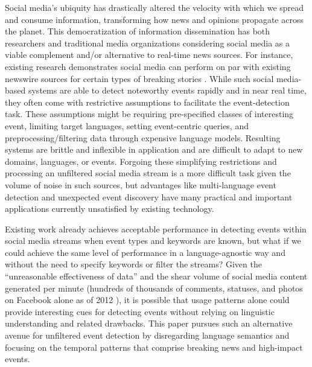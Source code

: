 \documentclass{acm_proc_article-sp}
\begin{document}
Social media's ubiquity has drastically altered the velocity with which we spread and consume information, transforming how news and opinions propagate across the planet. 
This democratization of information dissemination has both researchers and traditional media organizations considering social media as a viable complement and/or alternative to real-time news sources.
For instance, existing research demonstrates social media can perform on par with existing newswire sources for certain types of breaking stories \cite{petrovic2013can}.
While such social media-based systems are able to detect noteworthy events rapidly and in near real time, they often come with restrictive assumptions to facilitate the event-detection task.
These assumptions might be requiring pre-specified classes of interesting event, limiting target languages, setting event-centric queries, and preprocessing/filtering data through expensive language models.
Resulting systems are brittle and inflexible in application and are difficult to adapt to new domains, languages, or events.
Forgoing these simplifying restrictions and processing an unfiltered social media stream is a more difficult task given the volume of noise in such sources, but advantages like multi-language event detection and unexpected event discovery have many practical and important applications currently  unsatisfied by existing technology.

Existing work already achieves acceptable performance in detecting events within social media streams when event types and keywords are known, but what if we could achieve the same level of performance in a language-agnostic way and without the need to specify keywords or filter the streams?
Given the ``unreasonable effectiveness of data'' and the shear volume of social media content  generated per minute (hundreds of thousands of comments, statuses, and photos on Facebook alone as of 2012 \cite{Pring2012}), it is possible that usage patterns alone could provide interesting cues for detecting events without relying on linguistic understanding and related drawbacks.
This paper pursues such an alternative avenue for unfiltered event detection by disregarding language semantics and focusing on the temporal patterns that comprise breaking news and high-impact events.
\end{document}

